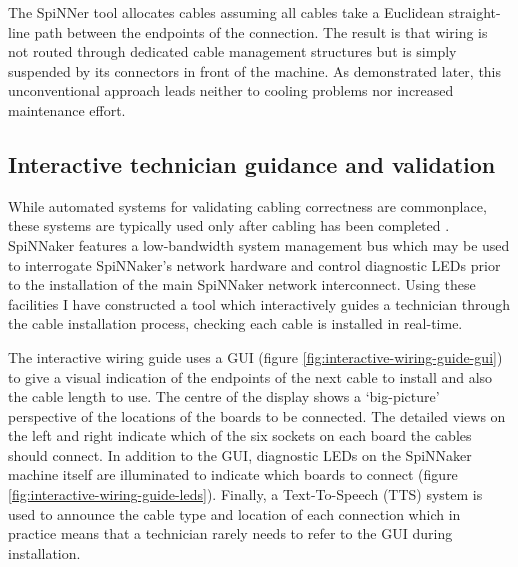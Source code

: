 			The SpiNNer tool allocates cables assuming all cables take a Euclidean
			straight-line path between the endpoints of the connection. The result is
			that wiring is not routed through dedicated cable management structures
			but is simply suspended by its connectors in front of the machine. As
			demonstrated later, this unconventional approach leads neither to cooling
			problems nor increased maintenance effort.
		
		\subsection{Interactive technician guidance and validation}
			
			While automated systems for validating cabling correctness are
			commonplace, these systems are typically used only after cabling has been
			completed \cite{lakner07}. SpiNNaker features a low-bandwidth system
			management bus which may be used to interrogate SpiNNaker's network
			hardware and control diagnostic LEDs prior to the installation of the
			main SpiNNaker network interconnect. Using these facilities I have
			constructed a tool which interactively guides a technician through the
			cable installation process, checking each cable is installed in
			real-time.
			
			The interactive wiring guide uses a GUI (figure
			\ref{fig:interactive-wiring-guide-gui}) to give a visual indication of
			the endpoints of the next cable to install and also the cable length to
			use. The centre of the display shows a `big-picture' perspective of the
			locations of the boards to be connected. The detailed views on the left
			and right indicate which of the six sockets on each board the cables
			should connect. In addition to the GUI, diagnostic LEDs on the SpiNNaker
			machine itself are illuminated to indicate which boards to connect
			(figure \ref{fig:interactive-wiring-guide-leds}). Finally, a
			Text-To-Speech (TTS) system is used to announce the cable type and
			location of each connection which in practice means that a technician
			rarely needs to refer to the GUI during installation.
			

